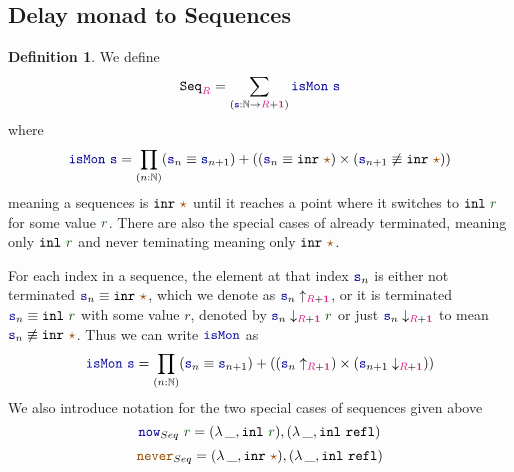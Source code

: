 \documentclass[twoside,11pt,openright]{report}
\theoremstyle{plain} %
\theoremstyle{definition}
\newtheorem{defn}[thm]{Definition}%
\theoremstyle{remark}
\newcommand*{\term}[1]{\textcolor{green!30!black}{#1}} %
\newcommand*{\type}[1]{\textcolor{magenta!90!black}{#1}}
\newcommand*{\unit}{\type{\textbf{1}}}
\newcommand*{\constant}[1]{\textcolor{orange!60!black}{\ensuremath{\mathtt{#1}}}}
\newcommand*{\function}[1]{\textcolor{blue!60!black}{\ensuremath{\mathtt{#1}}}}
\newcommand*{\typeformer}[1]{\ensuremath{\mathtt{#1}}}
\newcommand*{\unitelem}{\constant{\star}} %
\begin{document}
\subsection{Delay monad to Sequences}
\begin{defn}
  We define
  \begin{equation}
    \typeformer{Seq}_{\type{R}} = \sum_{(\function{s} : \mathbb{N} \rightarrow \type{R} + \unit)} \function{isMon}~\function{s}
  \end{equation}
  where
  \begin{equation}
    \function{isMon}~\function{s} = \prod_{(n : \mathbb{N})} (\function{s}_n \equiv \function{s}_{n+1})  + ((\function{s}_n \equiv \mathtt{inr}~\unitelem) \times (\function{s}_{n+1} \not\equiv \mathtt{inr}~\unitelem))
  \end{equation}
  meaning a sequences is \(\mathtt{inr}~\unitelem\) until it reaches a point where it switches to \(\mathtt{inl}~\term{r}\) for some value \(\term{r}\). There are also the special cases of already terminated, meaning only \(\mathtt{inl}~\term{r}\) and never teminating meaning only \(\mathtt{inr}~\unitelem\).
\end{defn}
\noindent For each index in a sequence, the element at that index \(\function{s}_n\) is either not terminated \(\function{s}_n \equiv \mathtt{inr}~\unitelem\), which we denote as \(\function{s}_n \uparrow_{\type{R} + \unit}\), or it is terminated \(\function{s}_n \equiv \mathtt{inl}~\term{r}\) with some value \(r\), denoted by \(\function{s}_n \downarrow_{\type{R} + \unit} \term{r}\) or just \(\function{s}_n \downarrow_{\type{R} + \unit}\) to mean \(\function{s}_n \not\equiv \mathtt{inr}~\unitelem\). Thus we can write \(\function{isMon}\) as
\begin{equation}
  \function{isMon}~\function{s} = \prod_{(n : \mathbb{N})} (\function{s}_n \equiv \function{s}_{n+1})  + ((\function{s}_n \uparrow_{\type{R} + \unit}) \times (\function{s}_{n+1} \downarrow_{\type{R} + \unit}))
\end{equation}
We also introduce notation for the two special cases of sequences given above
\begin{equation}
  \function{now}_{Seq}~\term{r} = (\lambda\,\_, \mathtt{inl}~\term{r}) , (\lambda\,\_, \mathtt{inl}~\mathtt{refl})
\end{equation}
\begin{equation}
  \constant{never}_{Seq} = (\lambda\,\_, \mathtt{inr}~\unitelem) , (\lambda\,\_, \mathtt{inl}~\mathtt{refl})
\end{equation}
\end{document}
